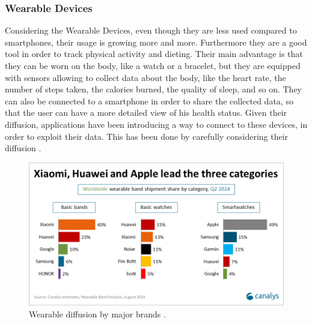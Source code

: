 \subsubsection{Wearable Devices} %
\label{sec:wearableDevices}
Considering the Wearable Devices, even though they are less used compared to smartphones, their usage is growing more and more. Furthermore they are a good tool in order to track physical activity and dieting. Their main advantage is that they can be worn on the body, like a watch or a bracelet, but they are equipped with sensors allowing to collect data about the body, like the heart rate, the number of steps taken, the calories burned, the quality of sleep, and so on. They can also be connected to a smartphone in order to share the collected data, so that the user can have a more detailed view of his health status. Given their diffusion, applications have been introducing a way to connect to these devices, in order to exploit their data. This has been done by carefully considering their diffusion \cite{WearableDevicesBrandDiffusion}.
\begin{figure}
    \includegraphics[width=1.0\linewidth]{./images/wearable_brand_diffusion.png}
    \caption[Wearable diffusion by major brands.]{Wearable diffusion by major brands \protect\cite{WearableDevicesBrandDiffusion}.}
    \label{fig:brandDiffusion}
\end{figure}
\FloatBarrier

